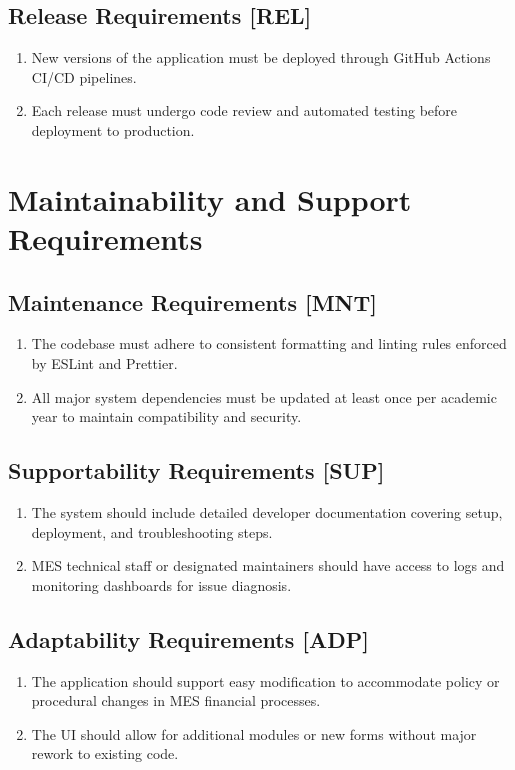 \documentclass[12pt]{article}
\begin{document}
  \subsection{Release Requirements [REL]}
    \begin{enumerate}
      \item New versions of the application must be deployed through GitHub Actions CI/CD pipelines.
      \item Each release must undergo code review and automated testing before deployment to production.
    \end{enumerate}

\section{Maintainability and Support Requirements}

\subsection{Maintenance Requirements [MNT]}
\begin{enumerate}
    \item The codebase must adhere to consistent formatting and linting rules enforced by ESLint and Prettier.
    \item All major system dependencies must be updated at least once per academic year to maintain compatibility and security.
\end{enumerate}

\subsection{Supportability Requirements [SUP]}
\begin{enumerate}
    \item The system should include detailed developer documentation covering setup, deployment, and troubleshooting steps.
    \item MES technical staff or designated maintainers should have access to logs and monitoring dashboards for issue diagnosis.
\end{enumerate}

\subsection{Adaptability Requirements [ADP]}
\begin{enumerate}
    \item The application should support easy modification to accommodate policy or procedural changes in MES financial processes.
    \item The UI should allow for additional modules or new forms without major rework to existing code.
\end{enumerate}
\end{document}
